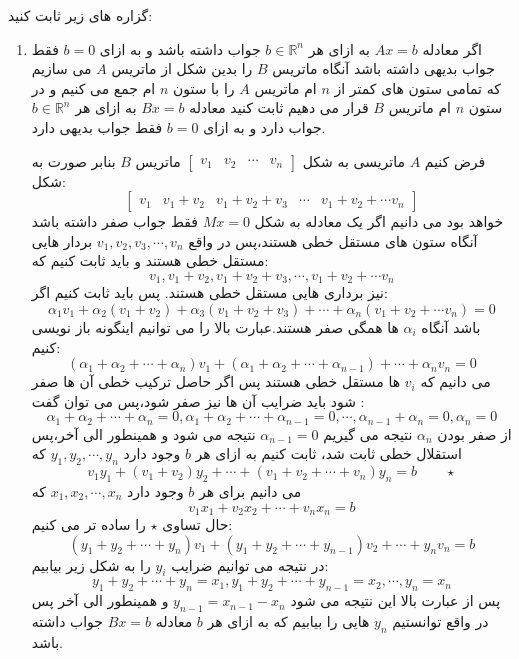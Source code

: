 \documentclass{article}
\begin{document}
گزاره های زیر ثابت کنید:
\begin{enumerate}
\item 
	اگر معادله 
	$Ax=b$
	به ازای هر 
	$b\in \mathbb{R}^n$
	جواب داشته باشد و به ازای 
	$b=0$
	فقط جواب بدیهی داشته باشد آنگاه  ماتریس 
	$B$
	 را بدین شکل از ماتریس 
	 $A$ 
	 می سازیم که تمامی ستون های کمتر از 
	 $n$ 
	ام ماتریس 
	$A$
	 را با ستون 
	 $n$
	 ام جمع می کنیم و در  ستون 
	 $n $
	 ام ماتریس 
	 $B$
	 قرار می دهیم ثابت کنید معادله 
	 $Bx=b$
	 به ازای هر 
	 $b\in \mathbb{R}^n$
	 جواب دارد و به ازای 
	 $b=0$
	 فقط جواب بدیهی دارد.
	 \begin{حل}
	 	فرض کنیم 
	 	$A$
	 	ماتریسی به شکل 
	 	$\begin{bmatrix}
	 	v_1&v_2&\cdots&v_n
	 	\end{bmatrix}$
	 	ماتریس $B$  بنابر صورت به شکل:
	 	$$\begin{bmatrix}
	 	v_1&v_1+v_2&v_1+v_2+v_3&\cdots&v_1+v_2+\cdots v_n
	 	\end{bmatrix}$$
	 	خواهد بود می دانیم اگر یک معادله به شکل 
	 	$Mx=0$
	 	فقط جواب صفر داشته باشد آنگاه ستون های مستقل خطی هستند،پس در واقع 
	 	$v_1,v_2,v_3,\cdots,v_n$
	 	بردار هایی مستقل خطی هستند و باید ثابت کنیم که:
	 	$$	v_1,v_1+v_2,v_1+v_2+v_3,\cdots,v_1+v_2+\cdots v_n$$
	 	نیز برداری هایی مستقل خطی هستند. پس باید ثابت کنیم اگر:
	 	$$\alpha_1v_1+\alpha_2(v_1+v_2)+\alpha_3(v_1+v_2+v_3)+\cdots+\alpha_n(v_1+v_2+\cdots v_n)=0$$
	 	باشد آنگاه
	 	$\alpha_i$
	 	ها همگی صفر هستند.عبارت بالا را می توانیم اینگونه باز نویسی کنیم:
	 	$$(\alpha_1+\alpha_2+\cdots+\alpha_n)v_1+(\alpha_1+\alpha_2+\cdots+\alpha_{n-1})+\cdots+\alpha_nv_n=0$$
	 	می دانیم که $v_i$ ها مستقل خطی هستند پس اگر حاصل ترکیب خطی آن ها صفر شود باید ضرایب آن ها نیز صفر شود،پس می توان گفت :
	 	$$\alpha_1+\alpha_2+\cdots+\alpha_n=0,\alpha_1+\alpha_2+\cdots+\alpha_{n-1}=0,\cdots,\alpha_{n-1}+\alpha_n=0,\alpha_n=0$$
 	 	از صفر بودن $\alpha_n$ نتیجه می گیریم 
 	 	$\alpha_{n-1}=0$
 	 	نتیجه می شود و همینطور الی آخر،پس استقلال خطی ثابت شد، ثابت کنیم 
 	 	به ازای هر 
 	 	$b$
 	 	وجود دارد 
 	 	$y_1,y_2,\cdots ,y_n$
 	 	که 
 	 	$$v_1y_1+(v_1+v_2)y_2+\cdots+(v_1+v_2+\cdots+v_n)y_n=b\qquad \star$$
 	 	می دانیم برای هر 
 	 	$b$
 	 	وجود دارد 
 	 		$x_1,x_2,\cdots ,x_n$
 	 	که 
 	 	$$v_1x_1+v_2x_2+\cdots+v_nx_n=b$$
 	 	حال تساوی $\star$ را ساده تر می کنیم:
 	 	$$(y_1+y_2+\cdots+y_n)v_1+(y_1+y_2+\cdots+y_{n-1})v_2+\cdots+y_nv_n=b$$
 	 	در نتیجه می توانیم ضرایب $y_i$ را به شکل زیر بیابیم:
 	 	$$y_1+y_2+\cdots+y_n=x_1,y_1+y_2+\cdots+y_{n-1}=x_2,\cdots,y_n=x_n$$
 	 	پس از عبارت بالا این نتیجه می شود
 	 	$y_{n-1}=x_{n-1}-x_{n}$
 	 	و همینطور الی آخر پس در واقع توانستیم $y_n$  هایی را بیابیم که به ازای هر $b$ معادله $Bx=b$ جواب داشته باشد.
 	 	

\end{حل}
\end{enumerate}
\end{document}
